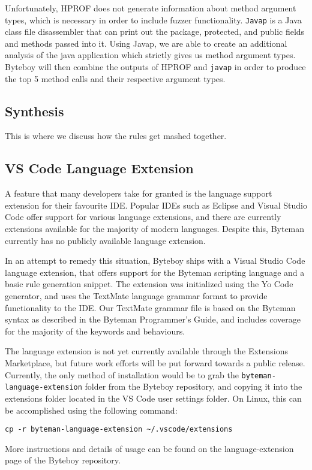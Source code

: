 \documentclass[letterpaper,twocolumn,10pt]{article}
\begin{document}
Unfortunately, HPROF does not generate information about method argument types, which is necessary in order to include fuzzer functionality. {\tt Javap} is a Java class file disassembler that can print out the package, protected, and public fields and methods passed into it\cite{javap}. Using Javap, we are able to create an additional analysis of the java application which strictly gives us method argument types. Byteboy will then combine the outputs of HPROF and {\tt javap} in order to produce the top 5 method calls and their respective argument types.  

\subsection{Synthesis}

This is where we discuss how the rules get mashed together.

\subsection{VS Code Language Extension}

A feature that many developers take for granted is the language support extension for their favourite IDE. Popular IDEs such as Eclipse and Visual Studio Code offer support for various language extensions, and there are currently extensions available for the majority of modern languages. Despite this, Byteman currently has no publicly available language extension. 

In an attempt to remedy this situation, Byteboy ships with a Visual Studio Code language extension, that offers support for the Byteman scripting language and a basic rule generation snippet. The extension was initialized using the Yo Code generator\cite{yocode}, and uses the TextMate language grammar format\cite{textmate} to provide functionality to the IDE. Our TextMate grammar file is based on the Byteman syntax as described in the Byteman Programmer's Guide\cite{bytemanguide}, and includes coverage for the majority of the keywords and behaviours.

The language extension is not yet currently available through the Extensions Marketplace, but future work efforts will be put forward towards a public release. Currently, the only method of installation would be to grab the {\tt byteman-language-extension} folder from the Byteboy repository, and copying it into the extensions folder located in the VS Code user settings folder. On Linux, this can be accomplished using the following command: 
\begin{center}
{\tt cp -r byteman-language-extension \textasciitilde/.vscode/extensions}
\end{center}
More instructions and details of usage can be found on the language-extension page of the Byteboy repository\cite{bytemanextension}.
\end{document}
